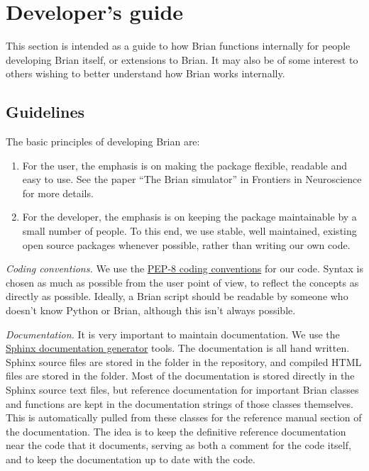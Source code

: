 \documentclass[letterpaper,10pt,english]{manual}
\begin{document}
\chapter{Developer's guide}

This section is intended as a guide to how Brian functions internally for
people developing Brian itself, or extensions to Brian. It may also be of some
interest to others wishing to better understand how Brian works internally.

\resetcurrentobjects
\hypertarget{--doc-developer-guidelines}{}

\section{Guidelines}

The basic principles of developing Brian are:
\begin{enumerate}
\item {} 
For the user, the emphasis is on making the package flexible, readable and
easy to use. See the paper ``The Brian simulator'' in Frontiers in Neuroscience
for more details.

\item {} 
For the developer, the emphasis is on keeping the package maintainable by
a small number of people. To this end, we use stable, well maintained,
existing open source packages whenever possible, rather than writing our
own code.

\end{enumerate}

\emph{Coding conventions.}
We use the \href{http://www.python.org/dev/peps/pep-0008/}{PEP-8 coding conventions}
for our code. Syntax is chosen as much as possible from the user point of view,
to reflect the concepts as directly as possible. Ideally, a Brian script
should be readable by someone who doesn't know Python or Brian, although this
isn't always possible.

\emph{Documentation.}
It is very important to maintain documentation. We use the
\href{http://sphinx.pocoo.org/}{Sphinx documentation generator} tools. The
documentation is all hand written. Sphinx source files are stored in the
 folder in the repository, and compiled HTML files are stored in
the  folder. Most of the documentation is stored directly in the Sphinx
source text files, but reference documentation for important Brian classes and
functions are kept in the documentation strings of those classes themselves.
This is automatically pulled from these classes for the reference manual
section of the documentation. The idea is to keep the definitive reference
documentation near the code that it documents, serving as both a comment for
the code itself, and to keep the documentation up to date with the code.
\end{document}

